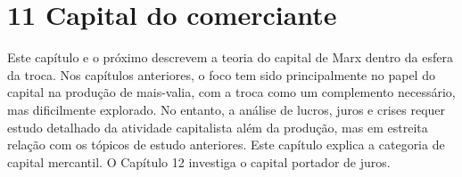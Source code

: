 \chapter{11 Capital do comerciante}\label{11 Capital do comerciante}
 \par 
Este capítulo e o próximo descrevem a teoria do capital de Marx dentro da esfera da troca. Nos capítulos anteriores, o foco tem sido principalmente no papel do capital na produção de mais-valia, com a troca como um complemento necessário, mas dificilmente explorado. No entanto, a análise de lucros, juros e crises requer estudo detalhado da atividade capitalista além da produção, mas em estreita relação com os tópicos de estudo anteriores. Este capítulo explica a categoria de capital mercantil. O Capítulo {\color{blue}12} investiga o capital portador de juros.
 \par 
